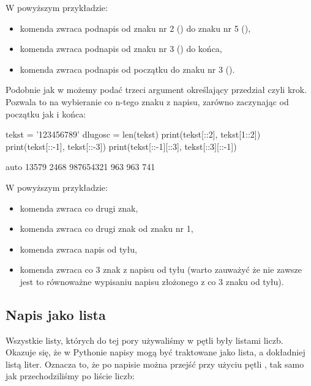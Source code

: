\documentclass{pdfBooklets}
\begin{document}
\pagebreak[2]\noindent
W powyższym przykładzie:
\begin{itemize}
\item komenda  zwraca podnapis od znaku nr 2 () do znaku nr 5 
(),
\item komenda  zwraca podnapis od znaku nr 3 () do końca, 
\item komenda  zwraca podnapis od początku do znaku nr 3 
().
\end{itemize}

Podobnie jak w  możemy podać trzeci argument określający przedział czyli krok.
Pozwala to na wybieranie co n-tego znaku z napisu, zarówno zaczynając od początku jak i końca:

\begin{CodeFrame}[python]{.7\textwidth}
tekst = '123456789'
dlugosc = len(tekst)
print(tekst[::2], tekst[1::2])
print(tekst[::-1], tekst[::-3])
print(tekst[::-1][::3], tekst[::3][::-1])
\end{CodeFrame}
\begin{CodeFrame}{auto}
13579 2468
987654321 963
963 741
\end{CodeFrame}

\pagebreak[2]\noindent
W powyższym przykładzie:
\begin{itemize}
\item komenda  zwraca co drugi znak,
\item komenda  zwraca co drugi znak od znaku nr 1,
\item komenda  zwraca napis od tyłu,
\item komenda  zwraca co 3 znak z napisu od tyłu (warto zauważyć że nie zawsze jest to równoważne wypisaniu napisu złożonego z co 3 znaku od tyłu).
\end{itemize}

\subsection{Napis jako lista}

Wszystkie listy, których do tej pory używaliśmy w pętli  były listami liczb.
Okazuje się, że w Pythonie napisy mogą być traktowane jako lista, a dokładniej listą liter. 
Oznacza to, że po napisie można przejść przy użyciu pętli , tak samo jak przechodziliśmy po liście liczb:
\end{document}

